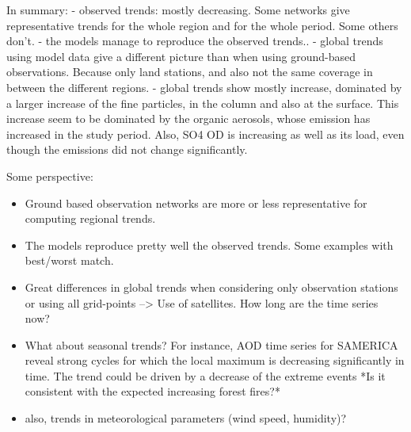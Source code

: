 \documentclass[journal abbreviation, manuscript]{copernicus}
\begin{document}
\conclusions  %
In summary:
- observed trends: mostly decreasing. Some networks give representative trends for the whole region and for the whole period. Some others don't.
- the models manage to reproduce the observed trends..
- global trends using model data give a different picture than when using ground-based observations. Because only land stations, and also not the same coverage in between the different regions.
- global trends show mostly increase, dominated by a larger increase of the fine particles, in the column and also at the surface. This increase seem to be dominated by the organic aerosols, whose emission has increased in the study period. Also, SO4 OD is increasing as well as its load, even though the emissions did not change significantly.

Some perspective:
\begin{itemize}
 \item Ground based observation networks are more or less representative for computing regional trends.
 \item The models reproduce pretty well the observed trends. Some examples with best/worst match.
 \item Great differences in global trends when considering only observation stations or using all grid-points --> Use of satellites. How long are the time series now?
 \item What about seasonal trends? For instance, AOD time series for SAMERICA reveal strong cycles for which the local maximum is decreasing significantly in time. The trend could be driven by a decrease of the extreme events *Is it consistent with the expected increasing forest fires?*
 \item also, trends in meteorological parameters (wind speed, humidity)?
\end{itemize}







\end{document}
